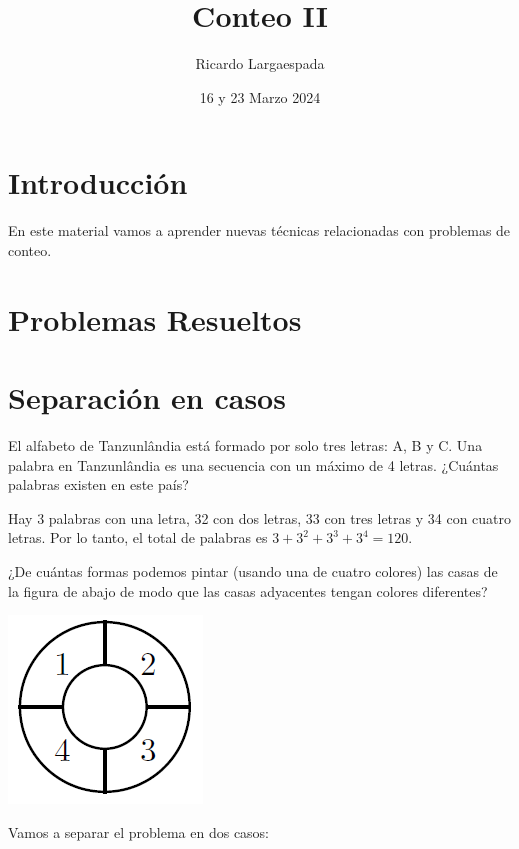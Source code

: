 \documentclass[11pt]{scrartcl}
\begin{document}
\title{Conteo II}
\author{Ricardo Largaespada}
\date{16 y 23 Marzo 2024}

\maketitle

\section{Introducción}

En este material vamos a aprender nuevas técnicas relacionadas con problemas de conteo.

\section{Problemas Resueltos}

\section*{Separación en casos}

\begin{example}
El alfabeto de Tanzunlândia está formado por solo tres letras: A, B y C. Una palabra en Tanzunlândia es una secuencia con un máximo de 4 letras. ¿Cuántas palabras existen en este país?
\end{example}
Hay 3 palabras con una letra, 32 con dos letras, 33 con tres letras y 34 con cuatro letras. Por lo tanto, el total de palabras es $3 + 3^2 + 3^3 + 3^4 = 120$.

\begin{example}
¿De cuántas formas podemos pintar (usando una de cuatro colores) las casas de la figura de abajo de modo que las casas adyacentes tengan colores diferentes?
\end{example}
\begin{center}
    \includegraphics[scale=1]{clase_05_dona.png}
\end{center}
Vamos a separar el problema en dos casos:
\end{document}
